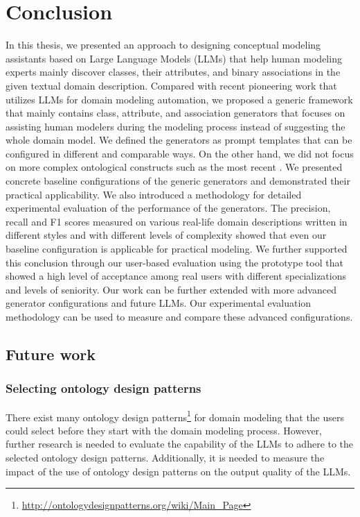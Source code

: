 \chapter{Conclusion}
\label{chap:conclusion}

In this thesis, we presented an approach to designing conceptual modeling assistants based on Large Language Models (LLMs) that help human modeling experts mainly discover classes, their attributes, and binary associations in the given textual domain description.
Compared with recent pioneering work that utilizes LLMs for domain modeling automation, we proposed a generic framework that mainly contains class, attribute, and association generators that focuses on assisting human modelers during the modeling process instead of suggesting the whole domain model.
We defined the generators as prompt templates that can be configured in different and comparable ways.
On the other hand, we did not focus on more complex ontological constructs such as the most recent \cite{Saeedizade2024}.
We presented concrete baseline configurations of the generic generators and demonstrated their practical applicability.
We also introduced a methodology for detailed experimental evaluation of the performance of the generators.
The precision, recall and F1 scores measured on various real-life domain descriptions written in different styles and with different levels of complexity showed that even our baseline configuration is applicable for practical modeling.
We further supported this conclusion through our user-based evaluation using the prototype tool that showed a high level of acceptance among real users with different specializations and levels of seniority.
Our work can be further extended with more advanced generator configurations and future LLMs.
Our experimental evaluation methodology can be used to measure and compare these advanced configurations.


\section{Future work}


\subsection{Selecting ontology design patterns}

There exist many ontology design patterns\footnote{\url{http://ontologydesignpatterns.org/wiki/Main_Page}} for domain modeling that the users could select before they start with the domain modeling process. However, further research is needed to evaluate the capability of the LLMs to adhere to the selected ontology design patterns. Additionally, it is needed to measure the impact of the use of ontology design patterns on the output quality of the LLMs. 


